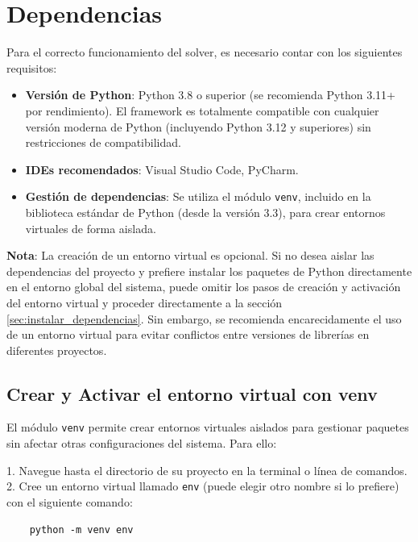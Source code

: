 \section{Dependencias}

Para el correcto funcionamiento del solver, es necesario contar con los siguientes requisitos:

\begin{itemize}
    \item \textbf{Versión de Python}: Python 3.8 o superior (se recomienda Python 3.11+ por rendimiento). El framework es totalmente compatible con cualquier versión moderna de Python (incluyendo Python 3.12 y superiores) sin restricciones de compatibilidad.
    \item \textbf{IDEs recomendados}: Visual Studio Code, PyCharm.
    \item \textbf{Gestión de dependencias}: Se utiliza el módulo \texttt{venv}, incluido en la biblioteca estándar de Python (desde la versión 3.3), para crear entornos virtuales de forma aislada.
\end{itemize}

\textbf{Nota}: La creación de un entorno virtual es opcional. Si no desea aislar las dependencias del proyecto y prefiere instalar los paquetes de Python directamente en el entorno global del sistema, puede omitir los pasos de creación y activación del entorno virtual y proceder directamente a la sección \ref{sec:instalar_dependencias}. Sin embargo, se recomienda encarecidamente el uso de un entorno virtual para evitar conflictos entre versiones de librerías en diferentes proyectos.

\subsection{Crear y Activar el entorno virtual con venv}

El módulo \texttt{venv} permite crear entornos virtuales aislados para gestionar paquetes sin afectar otras configuraciones del sistema. Para ello:

1.  Navegue hasta el directorio de su proyecto en la terminal o línea de comandos.
2.  Cree un entorno virtual llamado \texttt{env} (puede elegir otro nombre si lo prefiere) con el siguiente comando:

    \begin{verbatim}
    python -m venv env 
    \end{verbatim}

